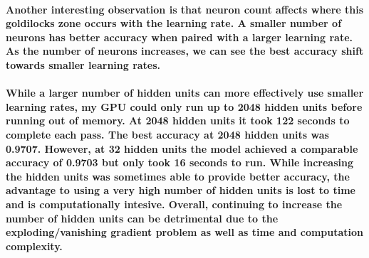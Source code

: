 \documentclass[10pt,a4paper]{report}
\begin{document}
\paragraph{
Another interesting observation is that neuron count affects where this goldilocks zone occurs with the learning rate. A smaller number of neurons has better accuracy when paired with a larger learning rate. As the number of neurons increases, we can see the best accuracy shift towards smaller learning rates.
}

\paragraph{
While a larger number of hidden units can more effectively use smaller learning rates, my GPU could only run up to 2048 hidden units before running out of memory. At 2048 hidden units it took 122 seconds to complete each pass. The best accuracy at 2048 hidden units was 0.9707. However, at 32 hidden units the model achieved a comparable accuracy of 0.9703 but only took 16 seconds to run. While increasing the hidden units was sometimes able to provide better accuracy, the advantage to using a very high number of hidden units is lost to time and is computationally intesive. Overall, continuing to increase the number of hidden units can be detrimental due to the exploding/vanishing gradient problem as well as time and computation complexity.
}
\end{document}
